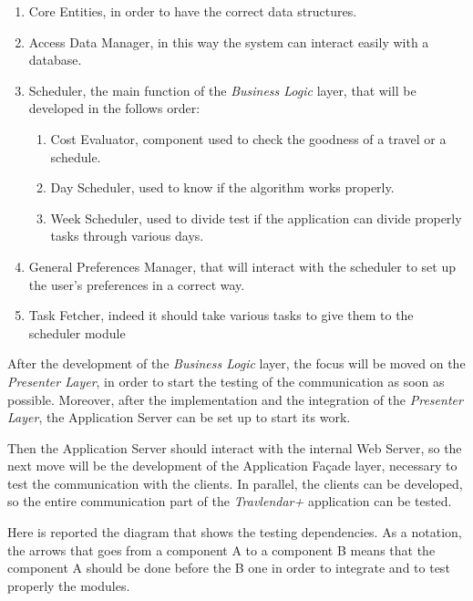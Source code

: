 \begin{enumerate}
    \item Core Entities, in order to have the correct data structures.
    \item Access Data Manager, in this way the system can interact easily with a database.
    \item Scheduler, the main function of the \emph{Business Logic} layer, that will be developed in the follows order:
    \begin{enumerate}
        \item Cost Evaluator, component used to check the goodness of a travel or a schedule.
        \item Day Scheduler, used to know if the algorithm works properly.
        \item Week Scheduler, used to divide test if the application can divide properly tasks through various days.
    \end{enumerate}
    \item General Preferences Manager, that will interact with the scheduler to set up the user's preferences in a correct way.
    \item Task Fetcher, indeed it should take various tasks to give them to the scheduler module
\end{enumerate}

After the development of the \emph{Business Logic} layer, the focus will be moved on the \emph{Presenter Layer}, in order to start the testing of the communication as soon as possible. Moreover, after the implementation and the integration of the \emph{Presenter Layer}, the Application Server can be set up to start its work.

Then the Application Server should interact with the internal Web Server, so the next move will be the development of the Application Façade layer, necessary to test the communication with the clients.
In parallel, the clients can be developed, so the entire communication part of the \emph{Travlendar+} application can be tested.

Here is reported the diagram that shows the testing dependencies. As a notation, the arrows that goes from a component A to a component B means that the component A should be done before the B one in order to integrate and to test properly the modules.

